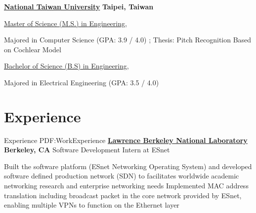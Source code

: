 \documentclass[a4paper,10pt,oneside]{article}
\begin{document}
\begin{body}
\EntryGap

\href{http://www.ntu.edu.tw/english/index.html}
{\textbf{National Taiwan University}}
\hfill
\textbf{Taipei, Taiwan}

\SmallEntryGap
\href{http://www.ee.ntu.edu.tw/graduate/}
{Master of Science (M.S.) in Engineering}, 
\begin{detail}
\BulletItem
Majored in Computer Science (GPA: 3.9 / 4.0)
;
Thesis: Pitch Recognition Based on Cochlear Model
\end{detail}

\SmallEntryGap
\href{http://www.ee.ntu.edu.tw/graduate/}
{Bachelor of Science  (B.S) in Engineering}, 
\begin{detail}
\BulletItem
Majored in Electrical Engineering (GPA: 3.5 / 4.0)
\end{detail}




\section{Experience}
{Experience}
{PDF:WorkExperience}
\href{https://www.es.net/}
{\textbf{Lawrence Berkeley National Laboratory}}
\hfill
\textbf{Berkeley, CA}
Software Development Intern at ESnet
\begin{detail}
\BulletItem
Built the software platform (ESnet Networking Operating System) and developed software defined production network (SDN) to facilitates worldwide academic networking research and enterprise networking needs
\BulletItem
Implemented MAC address translation including broadcast packet in the core network provided by ESnet, enabling multiple VPNs to function on the Ethernet layer
\end{detail}


\end{body}
\end{document}
